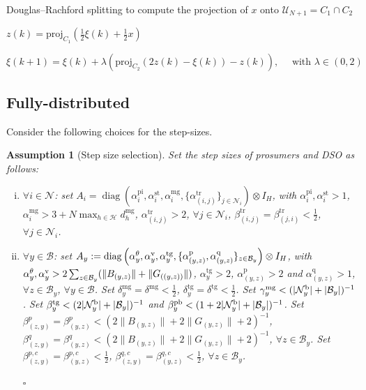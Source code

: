 \documentclass[10pt]{article}
\newtheorem{definitiox	n}{Definition}{\it}{}
\newtheorem{assumption}{Assumption}{\it}{}
\newcommand{\mc}{\mathcal}
\newcommand{\proj}{\mathrm{proj}}
\newcommand{\diag}{\operatorname{diag}}
\newcommand{\0}{\mathbf{0}}
\newcommand{\1}{\mathbf{1}}
\begin{document}
\begin{algorithm}[]
\caption{Douglas--Rachford splitting to compute the projection of $x$ onto $\mathcal{U}_{N+1} = C_1 \cap C_2$}
\begin{algorithmic}[1]

\smallskip
\IUC{ }

\smallskip
\State
$z(k) = \proj_{C_1}(\frac{1}{2} \xi(k) + \frac{1}{2}x)$ 


\smallskip
\State
$\xi(k+1) = \xi(k) + \lambda \left( \proj_{C_2}    (2z(k)-\xi(k)) - z(k)
\right), \quad \text{ with } \lambda \in (0,2)
$
\EndIUC

\end{algorithmic}
\end{algorithm}

\newpage

\newpage
\subsection{Fully-distributed}



Consider the following choices for the step-sizes.
\begin{assumption}[Step size selection]\label{ass:FD-SSS}
Set the step sizes of prosumers and DSO as follows:
\begin{enumerate}[(i)]
\item $\forall i \in \mc N$: set $A_i = \diag( \alpha_{i}^{\text{pi}}, \alpha_{i}^{\text{st}} , \alpha_{i}^{\text{mg}} , \{ \alpha_{(i,j)}^{\text{tr}} \}_{j \in \mc N_i} ) \otimes I_H$, with $\alpha_{i}^{\text{pi}}, \alpha_{i}^{\text{st}} > 1$, $ \alpha_{i}^{\text{mg}} > 3 + N \max_{h\in \mc H} d_h^{\text{mg}} $, $\alpha_{(i,j)}^{\text{tr}} > 2$, $\forall j \in \mc N_i$, $\beta^{\text{tr}}_{(i,j)} = \beta^{\text{tr}}_{ (j,i)} < \frac{1}{2}$, $\forall j \in \mc N_i$. 

\item $\forall y \in \mc B$: set $A_{y}:=\diag\left(
\alpha_y^{\theta},\alpha^{\text v}_y, \alpha_y^{\text{tg}},
\{ 
\alpha^\text{p}_{(y,z)}, \alpha^{\text{q}}_{(y,z)} 
\}_{z \in \mc B_y}
\right) \otimes I_H
$, with $\alpha_y^{\theta},\alpha^{\text v}_y > 2\sum_{z \in \mc B_y}(\|B_{(y,z)}\|+\|G_{((y,z))}\|)$, $\alpha_y^{\text{tg}} > 2$, $\alpha^{\text{p}}_{(y,z)} > 2$ and $ \alpha^{\text{q}}_{(y,z)} > 1 $, $\forall z \in \mc B_y$, $ \forall y \in \mc B$. Set $\delta^{\text{mg}}_y = \delta^{\text{mg}} <\frac{1}{2}$, $\delta^{\text{tg}}_y = \delta^{\text{tg}} <\frac{1}{2}$. Set $\gamma^{\text{mg}}_y < (|\mc N_{y}^{\rm b}| + |\mc B_y|)^{-1}$. Set $\beta^{\text{tg}}_y < ( 2|\mc N_{y}^{\rm b}| + |\mc B_y|)^{-1}$ and $\beta_y^{\text{pb}} < (1+2|\mc N_{y}^{\rm b}|+|\mc B_y|)^{-1}$.
Set $\beta^{p}_{(z,y)} = \beta^{p}_{ (y,z)} < (2\|B_{(y,z)}\|+2\|G_{(y,z)}\| + 2)^{-1}$, $\beta^{q}_{(z,y)} = \beta^{q}_{(y,z)} < ( 2\|B_{(y,z)}\|+ 2\|G_{(y,z)}\| + 2)^{-1}$, $\forall z \in \mc B_y$. Set $\beta^{p,c}_{(z,y)} = \beta^{p,c}_{ (y,z)} < \frac{1}{2}$, $\beta^{q,c}_{(z,y)} = \beta^{q,c}_{ (y,z)} < \frac{1}{2}$, $\forall z \in \mc B_y$.

{\hfill $\square$}
\end{enumerate}
\end{assumption}
\end{document}
